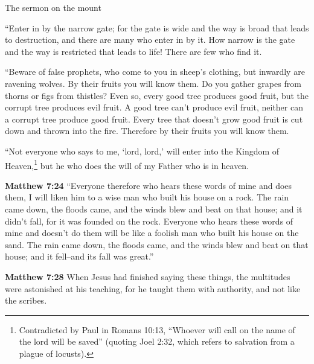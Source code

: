 \documentclass[10pt,a5paper,twoside]{article}
\newcommand{\quotesize}{\normalsize{}}
\newenvironment{quotetext}{\begingroup\quotesize}{\endgroup}
\newcommand{\intex}[1]{\index[texts]{#1}}
\newcommand{\bible}[2]{\begin{quotetext}\textbf{#1}\intex{#1} #2\end{quotetext}}
\newcommand{\matthew}[2]{\bible{Matthew #1}{#2}}
\begin{document}
\begin{section}{The sermon on the mount}
{   ``Enter in by the narrow gate; for the gate is wide and the way is broad that leads to destruction, and there are many who enter in by it.    How narrow is the gate and the way is restricted that leads to life! There are few who find it.

   ``Beware of false prophets, who come to you in sheep's clothing, but inwardly are ravening wolves.    By their fruits you will know them. Do you gather grapes from thorns or figs from thistles?    Even so, every good tree produces good fruit, but the corrupt tree produces evil fruit.    A good tree can't produce evil fruit, neither can a corrupt tree produce good fruit.    Every tree that doesn't grow good fruit is cut down and thrown into the fire.    Therefore by their fruits you will know them.

   ``Not everyone who says to me, `lord, lord,' will enter into the Kingdom of 
Heaven,\footnote{Contradicted by Paul in Romans 10:13, ``Whoever will call on the name of the lord will be saved''
(quoting Joel 2:32, which refers to salvation from a plague of locusts).\label{paul-contradicts-gospels}} but he who does the will of my Father who is in heaven.
}

\matthew{7:24}{
  ``Everyone therefore who hears these words of mine and does them, I will liken him to a wise man who built his house on a rock.    The rain came down, the floods came, and the winds blew and beat on that house; and it didn't fall, for it was founded on the rock.    Everyone who hears these words of mine and doesn't do them will be like a foolish man who built his house on the sand.    The rain came down, the floods came, and the winds blew and beat on that house; and it fell--and its fall was great.''
}

\matthew{7:28}{
  When Jesus had finished saying these things, the multitudes were astonished at his teaching,   for he taught them with authority, and not like the scribes.
}

\end{section}
\end{document}
